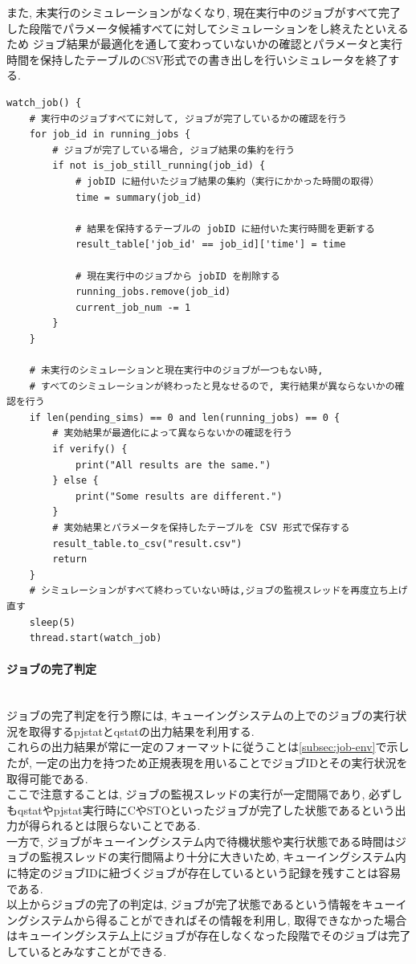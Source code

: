 また, 未実行のシミュレーションがなくなり, 現在実行中のジョブがすべて完了した段階でパラメータ候補すべてに対してシミュレーションをし終えたといえるため
ジョブ結果が最適化を通して変わっていないかの確認とパラメータと実行時間を保持したテーブルのCSV形式での書き出しを行いシミュレータを終了する.\\
{\footnotesize
\begin{lstlisting}[numbers=none, caption=ジョブ実行の監視と後処理　疑似コード]
watch_job() {
    # 実行中のジョブすべてに対して, ジョブが完了しているかの確認を行う
    for job_id in running_jobs {
        # ジョブが完了している場合, ジョブ結果の集約を行う
        if not is_job_still_running(job_id) {
            # jobID に紐付いたジョブ結果の集約（実行にかかった時間の取得）
            time = summary(job_id)

            # 結果を保持するテーブルの jobID に紐付いた実行時間を更新する
            result_table['job_id' == job_id]['time'] = time

            # 現在実行中のジョブから jobID を削除する
            running_jobs.remove(job_id)
            current_job_num -= 1
        }
    }

    # 未実行のシミュレーションと現在実行中のジョブが一つもない時,
    # すべてのシミュレーションが終わったと見なせるので, 実行結果が異ならないかの確認を行う
    if len(pending_sims) == 0 and len(running_jobs) == 0 {
        # 実効結果が最適化によって異ならないかの確認を行う
        if verify() {
            print("All results are the same.")
        } else {
            print("Some results are different.")
        }
        # 実効結果とパラメータを保持したテーブルを CSV 形式で保存する
        result_table.to_csv("result.csv")
        return
    }
    # シミュレーションがすべて終わっていない時は,ジョブの監視スレッドを再度立ち上げ直す
    sleep(5)
    thread.start(watch_job)
\end{lstlisting}
}

\paragraph{ジョブの完了判定}~\\
ジョブの完了判定を行う際には, キューイングシステムの上でのジョブの実行状況を取得するpjstatとqstatの出力結果を利用する.\\
これらの出力結果が常に一定のフォーマットに従うことは\ref{subsec:job-env}で示したが, 一定の出力を持つため正規表現を用いることでジョブIDとその実行状況を取得可能である.\\
ここで注意することは, ジョブの監視スレッドの実行が一定間隔であり,
必ずしもqstatやpjstat実行時にCやSTOといったジョブが完了した状態であるという出力が得られるとは限らないことである.\\
一方で, ジョブがキューイングシステム内で待機状態や実行状態である時間はジョブの監視スレッドの実行間隔より十分に大きいため,
キューイングシステム内に特定のジョブIDに紐づくジョブが存在しているという記録を残すことは容易である.\\
以上からジョブの完了の判定は, ジョブが完了状態であるという情報をキューイングシステムから得ることができればその情報を利用し,
取得できなかった場合はキューイングシステム上にジョブが存在しなくなった段階でそのジョブは完了しているとみなすことができる.\\

